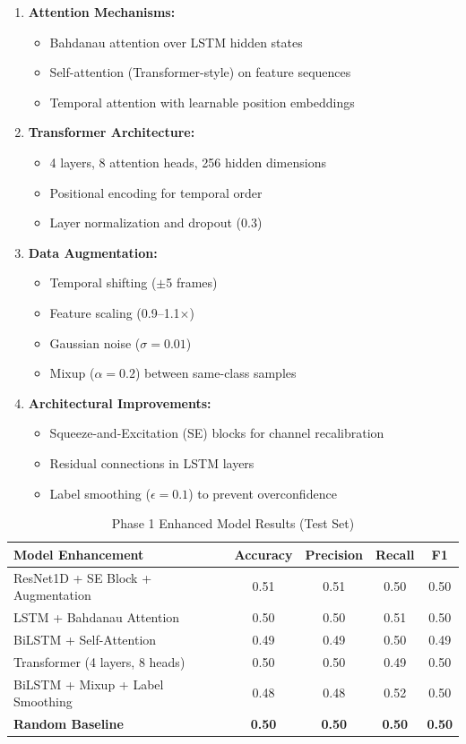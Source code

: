 \documentclass[11pt,a4paper]{article}
\begin{document}
\begin{enumerate}
\item \textbf{Attention Mechanisms:}
   \begin{itemize}
   \item Bahdanau attention over LSTM hidden states
   \item Self-attention (Transformer-style) on feature sequences
   \item Temporal attention with learnable position embeddings
   \end{itemize}

\item \textbf{Transformer Architecture:}
   \begin{itemize}
   \item 4 layers, 8 attention heads, 256 hidden dimensions
   \item Positional encoding for temporal order
   \item Layer normalization and dropout (0.3)
   \end{itemize}

\item \textbf{Data Augmentation:}
   \begin{itemize}
   \item Temporal shifting ($\pm$5 frames)
   \item Feature scaling (0.9--1.1$\times$)
   \item Gaussian noise ($\sigma = 0.01$)
   \item Mixup ($\alpha = 0.2$) between same-class samples
   \end{itemize}

\item \textbf{Architectural Improvements:}
   \begin{itemize}
   \item Squeeze-and-Excitation (SE) blocks for channel recalibration
   \item Residual connections in LSTM layers
   \item Label smoothing ($\epsilon = 0.1$) to prevent overconfidence
   \end{itemize}
\end{enumerate}

\begin{table}[H]
\centering
\caption{Phase 1 Enhanced Model Results (Test Set)}
\begin{tabular}{lcccc}
\toprule
Model Enhancement & Accuracy & Precision & Recall & F1 \\
\midrule
ResNet1D + SE Block + Augmentation & 0.51 & 0.51 & 0.50 & 0.50 \\
LSTM + Bahdanau Attention & 0.50 & 0.50 & 0.51 & 0.50 \\
BiLSTM + Self-Attention & 0.49 & 0.49 & 0.50 & 0.49 \\
Transformer (4 layers, 8 heads) & 0.50 & 0.50 & 0.49 & 0.50 \\
BiLSTM + Mixup + Label Smoothing & 0.48 & 0.48 & 0.52 & 0.50 \\
\midrule
\textbf{Random Baseline} & \textbf{0.50} & \textbf{0.50} & \textbf{0.50} & \textbf{0.50} \\
\bottomrule
\end{tabular}
\end{table}
\end{document}
